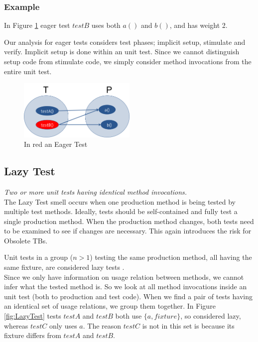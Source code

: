 \documentclass{uvamscse}
\begin{document}
\subsubsection{Example}
 In Figure \ref{fig:EagerTest} eager test $testB$ uses both $a()$ and $b()$, and has weight 2. 



Our analysis for eager tests considers test phases; implicit setup, stimulate and verify. Implicit setup is done within an unit test. Since we cannot distinguish setup code from stimulate code, we simply consider method invocations from the entire unit test. 



\begin{figure}[!ht]
	
	\centering
	\includegraphics[width=0.5\textwidth]{figures/EagerTest.png}
	\caption{In red an Eager Test}
	\label{fig:EagerTest}
\end{figure}

\subsection{Lazy Test}
\label{sec:lazy}
\emph{Two or more unit tests having identical method invocations.}\\

The Lazy Test smell occurs when one production method is being tested by multiple test methods. Ideally, tests should be self-contained and fully test a single production method. When the production method changes, both tests need to be examined to see if changes are necessary. This again introduces the risk for Obsolete TBs.

Unit tests in a group ($n > 1$) testing the same production method, all having the same fixture, are considered lazy tests \cite{van2001refactoring, meszaros2007xunit}.\\

Since we only have information on usage relation between methods, we cannot infer what the tested method is. So we look at all method invocations inside an unit test (both to production and test code). When we find a pair of tests having an identical set of usage relations, we group them together. In Figure \ref{fig:LazyTest} tests $testA$ and $testB$ both use $\{a,fixture\}$, so considered lazy, whereas $testC$ only uses $a$. The reason $testC$ is not in this set is because its fixture differs from $testA$ and $testB$. 
\end{document}
